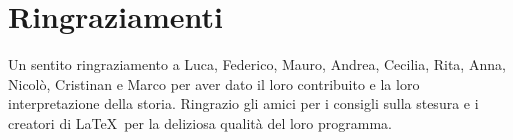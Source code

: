 
\begingroup
\let\clearpage\relax
\let\cleardoublepage\relax
\let\cleardoublepage\relax

\chapter*{Ringraziamenti}
Un sentito ringraziamento a Luca, Federico, Mauro, Andrea, Cecilia, Rita, Anna, Nicol\`o, Cristinan e Marco per aver dato il loro contribuito e la loro interpretazione della storia. Ringrazio gli amici per i consigli sulla stesura e i creatori di \LaTeX\ per la deliziosa qualit\`a del loro programma.
\endgroup




